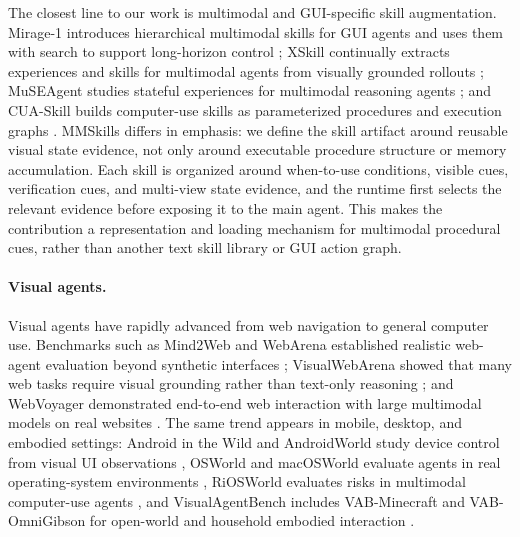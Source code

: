 \documentclass{llmxive}
\begin{document}
The closest line to our work is multimodal and GUI-specific skill augmentation. Mirage-1 introduces hierarchical multimodal skills for GUI agents and uses them with search to support long-horizon control \citep{xie2025mirage}; XSkill continually extracts experiences and skills for multimodal agents from visually grounded rollouts \citep{jiang2026xskillcontinuallearningexperience}; MuSEAgent studies stateful experiences for multimodal reasoning agents \citep{wang2026museagentmultimodalreasoningagent}; and CUA-Skill builds computer-use skills as parameterized procedures and execution graphs \citep{chen2026cuaskill}. MMSkills differs in emphasis: we define the skill artifact around reusable visual state evidence, not only around executable procedure structure or memory accumulation. Each skill is organized around when-to-use conditions, visible cues, verification cues, and multi-view state evidence, and the runtime first selects the relevant evidence before exposing it to the main agent. This makes the contribution a representation and loading mechanism for multimodal procedural cues, rather than another text skill library or GUI action graph.

\paragraph{Visual agents.}
Visual agents have rapidly advanced from web navigation to general computer use. Benchmarks such as Mind2Web and WebArena established realistic web-agent evaluation beyond synthetic interfaces \citep{deng2023mind2web,zhou2024webarena}; VisualWebArena showed that many web tasks require visual grounding rather than text-only reasoning \citep{koh2024visualwebarena}; and WebVoyager demonstrated end-to-end web interaction with large multimodal models on real websites \citep{he2024webvoyager}. The same trend appears in mobile, desktop, and embodied settings: Android in the Wild and AndroidWorld study device control from visual UI observations \citep{rawles2023androidwild,rawles2025androidworld}, OSWorld and macOSWorld evaluate agents in real operating-system environments \citep{xie2024osworld,yang2025macosworld}, RiOSWorld evaluates risks in multimodal computer-use agents \citep{yang2025riosworldbenchmarkingriskmultimodal}, and VisualAgentBench includes VAB-Minecraft and VAB-OmniGibson for open-world and household embodied interaction \citep{liu2024visualagentbench}.
\end{document}
